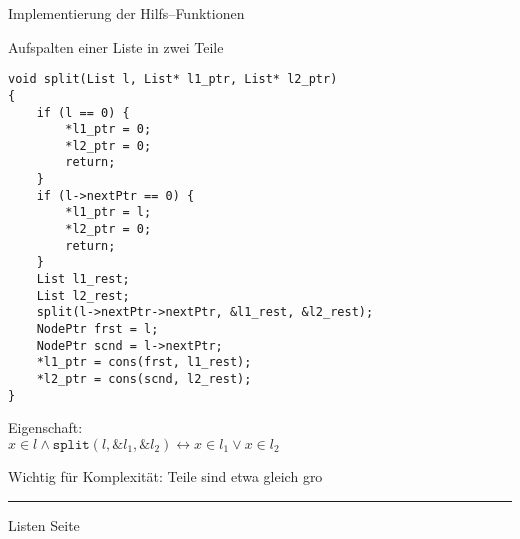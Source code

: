 \begin{slide}{}
\normalsize

\begin{center}
Implementierung der Hilfs--Funktionen
\end{center}
\vspace*{0.5cm}

\footnotesize
Aufspalten einer Liste in zwei Teile
\begin{verbatim}
void split(List l, List* l1_ptr, List* l2_ptr)
{
    if (l == 0) {
        *l1_ptr = 0;
        *l2_ptr = 0;
        return;
    }
    if (l->nextPtr == 0) {
        *l1_ptr = l;
        *l2_ptr = 0;
        return;
    }
    List l1_rest;
    List l2_rest;
    split(l->nextPtr->nextPtr, &l1_rest, &l2_rest);
    NodePtr frst = l;
    NodePtr scnd = l->nextPtr;
    *l1_ptr = cons(frst, l1_rest);
    *l2_ptr = cons(scnd, l2_rest);
}
\end{verbatim}
Eigenschaft: \\[0.3cm]
\hspace*{1.3cm} $x\in l \wedge \mathtt{split}(l, \&l_1, \&l_2) \leftrightarrow x \in l_1 \vee x \in l_2$
 
Wichtig f\"ur Komplexit\"at: Teile sind etwa gleich gro\3 

\vspace*{\fill}
\tiny \addtocounter{mypage}{1}
\rule{17cm}{1mm}
Listen  \hspace*{\fill} Seite 
\end{slide}


